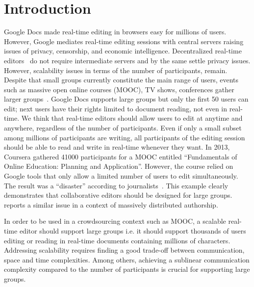 

\section{Introduction}

Google Docs made real-time editing in browsers easy for millions of
users. However, Google mediates real-time editing sessions with
central servers raising issues of privacy, censorship, and economic
intelligence. Decentralized real-time editors~\cite{oster2006data,
  sun1998operational, sun2009contextbased} do not require intermediate
servers and by the same settle privacy issues. However, scalability
issues in terms of the number of participants, remain.  Despite that
small groups currently constitute the main range of users, events such
as massive open online courses (MOOC), TV shows, conferences gather
larger groups~\cite{breslow2013studying}.  Google Docs supports large
groups but only the first 50 users can edit; next users have their
rights limited to document reading, not even in real-time.  We think
that real-time editors should allow users to edit at anytime and
anywhere, regardless of the number of participants. Even if only a
small subset among millions of participants are writing, all
participants of the editing session should be able to read and write
in real-time whenever they want. In 2013, Coursera gathered 41000
participants for a MOOC entitled ``Fundamentals of Online Education:
Planning and Application''. However, the course relied on Google tools
that only allow a limited number of users to edit simultaneously.  The result
was a ``disaster'' according to journalists~\cite{slate13,wp13}. This example
clearly demonstrates that collaborative editors should be designed for large
groups. \cite{chi12} reports a similar issue in a context of massively
distributed authorship.

In order to be used in a crowdsourcing context such as MOOC, a
scalable real-time editor should support large groups i.e. it should
support thousands of users editing or reading in real-time documents
containing millions of characters. Addressing scalability requires
finding a good trade-off between communication, space and time
complexities. Among others, achieving a sublinear communication
complexity compared to the number of participants is crucial for
supporting large groups.

